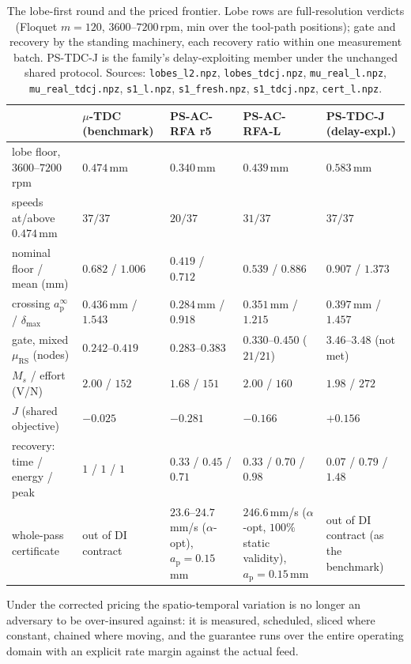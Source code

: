 \documentclass[preprint,12pt]{elsarticle}
\newcommand{\ap}{a_{\mathrm{p}}}
\newcommand{\muRS}{\mu_{\mathrm{RS}}}
\begin{document}
\begin{table}[t]
\centering\footnotesize
\setlength{\tabcolsep}{4pt}
\caption{The lobe-first round and the priced frontier.  Lobe rows are
full-resolution verdicts (Floquet $m = 120$, $3600$--$7200$\,rpm, min
over the tool-path positions); gate and recovery by the standing
machinery, each recovery ratio within one measurement batch.
PS-TDC-J is the family's delay-exploiting member under the unchanged
shared protocol.  Sources: \texttt{lobes\_l2.npz},
\texttt{lobes\_tdcj.npz}, \texttt{mu\_real\_l.npz},
\texttt{mu\_real\_tdcj.npz}, \texttt{s1\_l.npz},
\texttt{s1\_fresh.npz}, \texttt{s1\_tdcj.npz}, \texttt{cert\_l.npz}.}
\label{tab:lobefirst}
\begin{tabular}{@{}p{2.7cm}p{2.3cm}p{2.4cm}p{2.5cm}p{2.5cm}@{}}
\toprule
 & $\mu$-TDC (benchmark) & PS-AC-RFA r5 & PS-AC-RFA-L & PS-TDC-J
(delay-expl.) \\
\midrule
lobe floor, $3600$--$7200$\,rpm & $0.474$\,mm & $0.340$\,mm &
$0.439$\,mm & $0.583$\,mm \\
speeds at/above $0.474$\,mm & $37/37$ & $20/37$ & $31/37$ &
$37/37$ \\
nominal floor / mean (mm) & $0.682$ / $1.006$ & $0.419$ / $0.712$ &
$0.539$ / $0.886$ & $0.907$ / $1.373$ \\
crossing $\ap^{\infty}$ / $\delta_{\max}$ & $0.436$\,mm / $1.543$ &
$0.284$\,mm / $0.918$ & $0.351$\,mm / $1.215$ & $0.397$\,mm /
$1.457$ \\
gate, mixed $\muRS$ (nodes) & $0.242$--$0.419$ & $0.283$--$0.383$ &
$0.330$--$0.450$ ($21/21$) & $3.46$--$3.48$ (not met) \\
$M_s$ / effort (V/N) & $2.00$ / $152$ & $1.68$ / $151$ & $2.00$ /
$160$ & $1.98$ / $272$ \\
$J$ (shared objective) & $-0.025$ & $-0.281$ & $-0.166$ &
$+0.156$ \\
recovery: time / energy / peak & $1$ / $1$ / $1$ & $0.33$ / $0.45$ /
$0.71$ & $0.33$ / $0.70$ / $0.98$ & $0.07$ / $0.79$ / $1.48$ \\
whole-pass certificate & out of DI contract & $23.6$--$24.7$\,mm/s
(\mbox{$\alpha$-opt}), $\ap = 0.15$\,mm & $246.6$\,mm/s
(\mbox{$\alpha$-opt}, $100\%$ static validity), $\ap = 0.15$\,mm &
out of DI contract (as the benchmark) \\
\bottomrule
\end{tabular}
\end{table}

Under the corrected
pricing the spatio-temporal variation is no longer an adversary to be
over-insured against: it is measured, scheduled, sliced where
constant, chained where moving, and the guarantee runs over the
entire operating domain with an explicit rate margin against the
actual feed.
\end{document}
